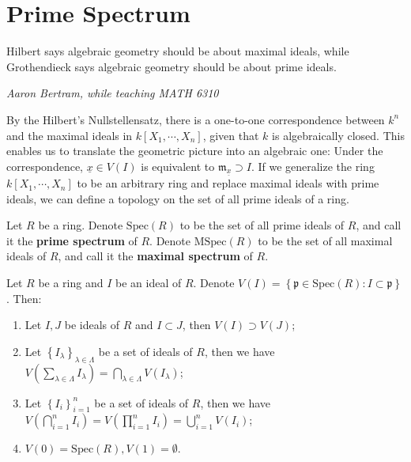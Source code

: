 \documentclass{note-eng}
\begin{document}
\fi

\section{Prime Spectrum}

\epigraph{Hilbert says algebraic geometry should be about maximal ideals, while Grothendieck says algebraic geometry should be about prime ideals.}{\textit{Aaron Bertram, while teaching MATH 6310}}

By the Hilbert's Nullstellensatz, there is a one-to-one correspondence between $k^n$ and the maximal ideals in $k[X_1, \cdots, X_n]$, given that $k$ is algebraically closed. This enables us to translate the geometric picture into an algebraic one: Under the correspondence, $\underline{x} \in V(I)$ is equivalent to $\mathfrak{m}_{\underline{x}} \supset I$. If we generalize the ring $k[X_1, \cdots, X_n]$ to be an arbitrary ring and replace maximal ideals with prime ideals, we can define a topology on the set of all prime ideals of a ring.

\begin{definition}
    Let $R$ be a ring. Denote $\mathrm{Spec}(R)$ to be the set of all prime ideals of $R$, and call it the \textbf{prime spectrum} of $R$. Denote $\mathrm{MSpec}(R)$ to be the set of all maximal ideals of $R$, and call it the \textbf{maximal spectrum} of $R$.
\end{definition}

\begin{proposition}
    Let $R$ be a ring and $I$ be an ideal of $R$. Denote $V(I) = \left\lbrace \mathfrak{p} \in \mathrm{Spec}(R): I \subset \mathfrak{p} \right\rbrace$. Then:
    \begin{enumerate}
        \item Let $I, J$ be ideals of $R$ and $I \subset J$, then $V(I) \supset V(J)$;
        \item Let $\left\lbrace I_\lambda \right\rbrace_{\lambda \in \Lambda}$ be a set of ideals of $R$, then we have $V\left(\sum\limits_{\lambda \in \Lambda} I_\lambda\right) = \bigcap\limits_{\lambda \in \Lambda} V(I_\lambda)$;
        \item Let $\left\lbrace I_i \right\rbrace_{i = 1}^n$ be a set of ideals of $R$, then we have $V \left(\bigcap\limits_{i = 1}^{n} I_i\right) = V \left(\prod\limits_{i = 1}^{n} I_i\right) = \bigcup\limits_{i = 1}^{n} V(I_i)$;
        \item $V(0) = \mathrm{Spec}(R), V(1) = \emptyset$.
    \end{enumerate}
\end{proposition}
\end{document}
